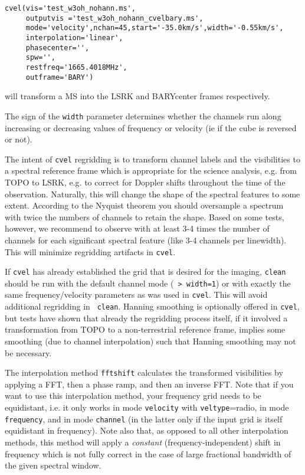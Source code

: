 {\begin{verbatim}
cvel(vis='test_w3oh_nohann.ms',
     outputvis ='test_w3oh_nohann_cvelbary.ms',
     mode='velocity',nchan=45,start='-35.0km/s',width='-0.55km/s',
     interpolation='linear',
     phasecenter='',
     spw='',
     restfreq='1665.4018MHz',
     outframe='BARY')

\end{verbatim}
\normalsize will transform a MS into the LSRK and BARYcenter frames
respectively.  

The sign of the {\tt width} parameter determines whether the channels
run along increasing or decreasing values of frequency or velocity (ie
if the cube is reversed or not). 



The intent of {\tt cvel} regridding is to transform channel labels and
the visibilities to a spectral reference frame which is appropriate
for the science analysis, e.g. from TOPO to LSRK, e.g. to correct for
Doppler shifts throughout the time of the observation. Naturally,
this will change the shape of the spectral features to some
extent. According to the Nyquist theorem you should oversample a
spectrum with twice the numbers of channels to retain the
shape. Based on some tests, however, we recommend to observe with at
least 3-4 times the number of channels for each significant spectral
feature (like 3-4 channels per linewidth). This will minimize
regridding artifacts in {\tt cvel}.  

If {\tt cvel} has already established the grid that is desired for the
imaging, {\tt clean} should be run with the default channel mode ({\tt
  > width=1}) or with exactly the same frequency/velocity parameters
as was used in {\tt cvel}. This will avoid additional regridding in {\tt
  clean}. Hanning smoothing is optionally offered in {\tt cvel}, but
tests have shown that already the regridding process itself, if it
involved a transformation from TOPO to a non-terrestrial reference
frame, implies some smoothing (due to channel interpolation) such that
Hanning smoothing may not be necessary.


The interpolation method {\tt fftshift} calculates the transformed
visibilities by applying a FFT, then a phase ramp, and then an inverse
FFT.  Note that if you want to use this interpolation method, your
frequency grid needs to be equidistant, i.e. it only works in mode
{\tt velocity} with {\tt veltype}=radio, in mode {\tt frequency}, and
in mode {\tt channel} (in the latter only if the input grid is itself
equidistant in frequency). Note also that, as opposed to all other
interpolation methods, this method will apply a {\it constant}
(frequency-independent) shift in frequency which is not fully correct
in the case of large fractional bandwidth of the given spectral
window.



}
